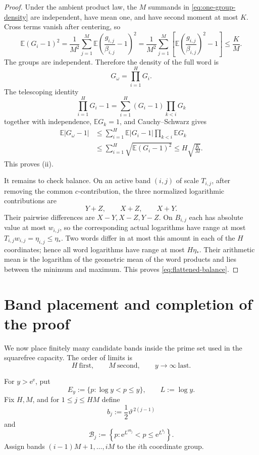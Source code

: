 \documentclass[11pt]{article}
\numberwithin{equation}{section}
\theoremstyle{plain}
\newcommand{\E}{\mathbb E}
\newcommand{\1}{\mathbf 1}
\newcommand{\e}{\mathrm e}
\newcommand{\cB}{\mathcal B}
\begin{document}
\begin{proof}
Under the ambient product law, the $M$ summands in
\eqref{eq:one-group-density} are independent, have mean one, and have
second moment at most $K$.  Cross terms vanish after centering, so
\begin{equation}\label{eq:average-variance}
 \E(G_i-1)^2
 =\frac1{M^2}
 \sum_{j=1}^M
 \E\left(\frac{g_{i,j}}{\beta_{i,j}}-1\right)^2
 =\frac1{M^2}
 \sum_{j=1}^M
 \left[
  \E\left(\frac{g_{i,j}}{\beta_{i,j}}\right)^2-1
 \right]
 \le\frac KM.
\end{equation}
The groups are independent.  Therefore the density of the full word is
\[
 G_\omega=\prod_{i=1}^H G_i.
\]
The telescoping identity
\[
 \prod_{i=1}^HG_i-1
 =
 \sum_{i=1}^H(G_i-1)\prod_{k<i}G_k
\]
together with independence, $\E G_k=1$, and Cauchy--Schwarz gives
\begin{align*}
 \E|G_\omega-1|
 &\le
 \sum_{i=1}^H
 \E|G_i-1|\prod_{k<i}\E G_k\\
 &\le
 \sum_{i=1}^H\sqrt{\E(G_i-1)^2}
 \le H\sqrt{\frac KM}.
\end{align*}
This proves (ii).

It remains to check balance.  On an active band $(i,j)$ of scale
$T_{i,j}$, after
removing the common $c$-contribution, the three normalized logarithmic
contributions are
\[
 Y+Z,\qquad X+Z,\qquad X+Y.
\]
Their pairwise differences are $X-Y,X-Z,Y-Z$.  On $B_{i,j}$ each has
absolute value at most $w_{i,j}$, so the corresponding actual logarithms
have range at most
$T_{i,j}w_{i,j}=\eta_{i,j}\le\eta_*$.  Two words differ in at most this amount in each of
the $H$ coordinates; hence all word logarithms have range at most
$H\eta_*$.  Their arithmetic mean is the logarithm of the geometric mean
of the word products and lies between the minimum and maximum.  This proves
\eqref{eq:flattened-balance}.
\end{proof}

\section{Band placement and completion of the proof}
\label{sec:completion}

We now place finitely many candidate bands inside the prime set used in the
squarefree capacity.  The order of limits is
\[
 H\ \text{first},\qquad M\ \text{second},\qquad
 y\to\infty\ \text{last}.
\]

For $y>\e^\e$, put
\begin{equation}\label{eq:final-prime-set}
 E_y:=\{p:\log y<p\le y\},
 \qquad L:=\log y.
\end{equation}
Fix $H,M$, and for $1\le j\le HM$ define
\begin{equation}\label{eq:band-exponents}
 b_j:=\frac12\vartheta^{\,2(j-1)}
\end{equation}
and
\begin{equation}\label{eq:placed-bands}
 \cB_j:=
 \left\{
 p:\e^{L^{\vartheta b_j}}<p\le\e^{L^{b_j}}
 \right\}.
\end{equation}
Assign bands $(i-1)M+1,\ldots,iM$ to the $i$th coordinate group.
\end{document}
